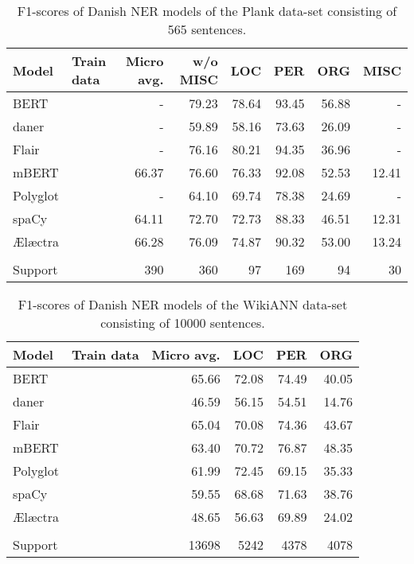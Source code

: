 \documentclass[main.tex]{subfiles}
\begin{document}
\begin{table}[H]
	\begin{center}
		\begin{tabular}{l l r r r r r r}
			Model & Train data & Micro avg. & w/o MISC & LOC & PER & ORG & MISC \\
			\hline
			BERT &  & - & 79.23 & 78.64 & 93.45 & 56.88 & - \\
			daner &  & - & 59.89 & 58.16 & 73.63 & 26.09 & - \\
			Flair &  & - & 76.16 & 80.21 & 94.35 & 36.96 & - \\
			mBERT &  & 66.37 & 76.60 & 76.33 & 92.08 & 52.53 & 12.41 \\
			Polyglot &  & - & 64.10 & 69.74 & 78.38 & 24.69 & - \\
			spaCy &  & 64.11 & 72.70 & 72.73 & 88.33 & 46.51 & 12.31 \\
			Ælæctra &  & 66.28 & 76.09 & 74.87 & 90.32 & 53.00 & 13.24 \\
			 &  &  &  &  &  &  &  \\
			Support &  & 390 & 360 & 97 & 169 & 94 & 30 \\
		\end{tabular}
	\end{center}
	\caption{F1\pro-scores of Danish NER models of the Plank data-set consisting of 565 sentences.}
	\label{tab:Plank}
\end{table}

\begin{table}[H]
	\begin{center}
		\begin{tabular}{l l r r r r}
			Model & Train data & Micro avg. & LOC & PER & ORG \\
			\hline
			BERT &  & 65.66 & 72.08 & 74.49 & 40.05 \\
			daner &  & 46.59 & 56.15 & 54.51 & 14.76 \\
			Flair &  & 65.04 & 70.08 & 74.36 & 43.67 \\
			mBERT &  & 63.40 & 70.72 & 76.87 & 48.35 \\
			Polyglot &  & 61.99 & 72.45 & 69.15 & 35.33 \\
			spaCy &  & 59.55 & 68.68 & 71.63 & 38.76 \\
			Ælæctra &  & 48.65 & 56.63 & 69.89 & 24.02 \\
			 &  &  &  &  &  \\
			Support &  & 13698 & 5242 & 4378 & 4078 \\
		\end{tabular}
	\end{center}
	\caption{F1\pro-scores of Danish NER models of the WikiANN data-set consisting of 10000 sentences.}
	\label{tab:WikiANN}
\end{table}
\end{document}
